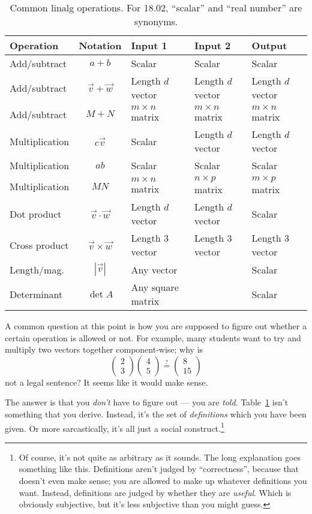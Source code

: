 \documentclass[11pt]{scrartcl}
\begin{document}
\begin{table}[h]
  \centering
  \begin{tabular}{lclll}
    \toprule
    Operation & Notation & Input 1 & Input 2 & Output \\ \midrule
    Add/subtract & $a+b$ & Scalar & Scalar & Scalar \\
    Add/subtract & $\vec v + \vec w$ & Length $d$ vector & Length $d$ vector & Length $d$ vector \\
    Add/subtract & $M+N$ & $m \times n$ matrix & $m \times n$ matrix & $m \times n$ matrix \\
    Multiplication & $c \vec v$ & Scalar & Length $d$ vector & Length $d$ vector \\
    Multiplication & $ab$ & Scalar & Scalar & Scalar \\
    Multiplication & $MN$ & $m \times n$ matrix & $n \times p$ matrix & $m \times p$ matrix \\
    Dot product & $\vec v \cdot \vec w$ & Length $d$ vector & Length $d$ vector & Scalar \\
    Cross product & $\vec v \times \vec w$ & Length $3$ vector & Length $3$ vector & Length $3$ vector \\
    Length/mag. & $\left\lvert \vec v \right\rvert$ & Any vector && Scalar \\
    Determinant & $\det A$ & Any square matrix && Scalar \\ \bottomrule
  \end{tabular}
  \caption{Common linalg operations.
    For 18.02, ``scalar'' and ``real number'' are synonyms.}
  \label{tab:operations}
\end{table}

A common question at this point is how you are supposed to figure out
whether a certain operation is allowed or not.
For example, many students want to try and multiply two vectors together component-wise;
why is
\[ \begin{pmatrix} 2 \\ 3 \end{pmatrix} \begin{pmatrix} 4 \\ 5 \end{pmatrix}
  \overset{?}{=} \begin{pmatrix} 8 \\ 15 \end{pmatrix} \]
not a legal sentence? It seems like it would make sense.

The answer is that you \emph{don't} have to figure out --- you are \emph{told}.
Table~\ref{tab:operations} isn't something that you derive.
Instead, it's the set of \emph{definitions} which you have been given.
Or more sarcastically, it's all just a social construct.\footnote{Of course,
  it's not quite as arbitrary as it sounds.
  The long explanation goes something like this.
  Definitions aren't judged by ``correctness'', because that doesn't even make sense;
  you are allowed to make up whatever definitions you want.
  Instead, definitions are judged by whether they are \emph{useful}.
  Which is obviously subjective, but it's less subjective than you might guess.}
\end{document}
